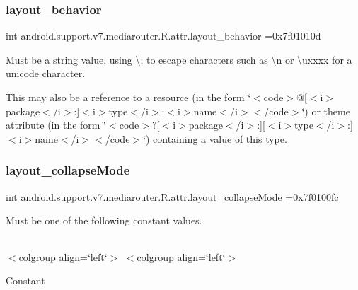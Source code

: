 \subsubsection{\texorpdfstring{layout\+\_\+behavior}{layout\_behavior}}
{\footnotesize\ttfamily int android.\+support.\+v7.\+mediarouter.\+R.\+attr.\+layout\+\_\+behavior =0x7f01010d\hspace{0.3cm}{\ttfamily [static]}}

Must be a string value, using \textquotesingle{}\textbackslash{};\textquotesingle{} to escape characters such as \textquotesingle{}\textbackslash{}n\textquotesingle{} or \textquotesingle{}\textbackslash{}uxxxx\textquotesingle{} for a unicode character. 

This may also be a reference to a resource (in the form \char`\"{}$<$code$>$@\mbox{[}$<$i$>$package$<$/i$>$\+:\mbox{]}$<$i$>$type$<$/i$>$\+:$<$i$>$name$<$/i$>$$<$/code$>$\char`\"{}) or theme attribute (in the form \char`\"{}$<$code$>$?\mbox{[}$<$i$>$package$<$/i$>$\+:\mbox{]}\mbox{[}$<$i$>$type$<$/i$>$\+:\mbox{]}$<$i$>$name$<$/i$>$$<$/code$>$\char`\"{}) containing a value of this type. \mbox{\label{classandroid_1_1support_1_1v7_1_1mediarouter_1_1R_1_1attr_a44d7e27bf5d67c11cc613491cfb7865c}} 
\subsubsection{\texorpdfstring{layout\+\_\+collapse\+Mode}{layout\_collapseMode}}
{\footnotesize\ttfamily int android.\+support.\+v7.\+mediarouter.\+R.\+attr.\+layout\+\_\+collapse\+Mode =0x7f0100fc\hspace{0.3cm}{\ttfamily [static]}}

Must be one of the following constant values.

\tabulinesep=1mm
\begin{longtabu} spread 0pt [c]{*{0}{|X[-1]}|}
\hline
\end{longtabu}
$<$colgroup align=\char`\"{}left\char`\"{}$>$ $<$colgroup align=\char`\"{}left\char`\"{}$>$ 

Constant

